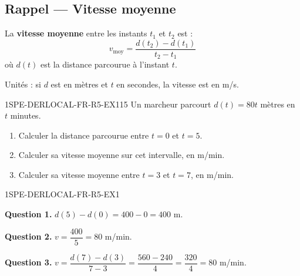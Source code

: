 

\subsection*{Rappel — Vitesse moyenne}

La \textbf{vitesse moyenne} entre les instants $t_1$ et $t_2$ est :
\[
  v_{\text{moy}} = \frac{d(t_2) - d(t_1)}{t_2 - t_1}
\]
où $d(t)$ est la distance parcourue à l'instant $t$.

Unités : si $d$ est en mètres et $t$ en secondes, la vitesse est en m/s.


\begin{exercice}{1SPE-DERLOCAL-FR-R5-EX1}{1}{5}
Un marcheur parcourt $d(t) = 80t$ mètres en $t$ minutes.
\begin{enumerate}
  \item Calculer la distance parcourue entre $t=0$ et $t=5$.
  \item Calculer sa vitesse moyenne sur cet intervalle, en m/min.
  \item Calculer sa vitesse moyenne entre $t=3$ et $t=7$, en m/min.
\end{enumerate}
\end{exercice}


\begin{corrige}{1SPE-DERLOCAL-FR-R5-EX1}

\textbf{Question 1.}
$d(5) - d(0) = 400 - 0 = 400$ m.

\textbf{Question 2.}
$v = \dfrac{400}{5} = 80$ m/min.

\textbf{Question 3.}
$v = \dfrac{d(7)-d(3)}{7-3} = \dfrac{560 - 240}{4} = \dfrac{320}{4} = 80$ m/min.

\end{corrige}

